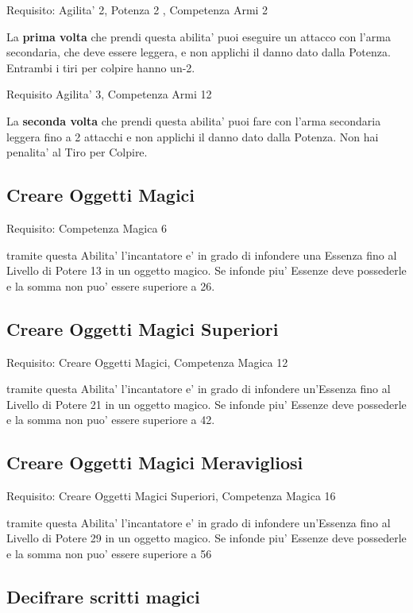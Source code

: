 \documentclass[a4paper,11pt,twoside,openany]{dndbook}
\begin{document}
Requisito: Agilita' 2, Potenza 2 , Competenza Armi 2

La \textbf{prima volta} che prendi questa abilita' puoi eseguire un attacco con l'arma secondaria, che deve essere leggera, e non applichi il danno dato dalla Potenza. Entrambi i tiri per colpire hanno un-2.

Requisito Agilita' 3, Competenza Armi 12

La \textbf{seconda volta} che prendi questa abilita' puoi fare con l'arma secondaria leggera fino a 2 attacchi e non applichi il danno dato dalla Potenza. Non hai penalita' al Tiro per Colpire.

\subsection{Creare Oggetti Magici}

Requisito: Competenza Magica 6

tramite questa Abilita' l'incantatore e' in grado di infondere una Essenza fino al Livello di Potere 13 in un oggetto magico. Se infonde piu' Essenze deve possederle e la somma non puo' essere superiore a 26.

\subsection{Creare Oggetti Magici Superiori}

Requisito: Creare Oggetti Magici, Competenza Magica 12

tramite questa Abilita' l'incantatore e' in grado di infondere un'Essenza fino al Livello di Potere 21 in un oggetto magico. Se infonde piu' Essenze deve possederle e la somma non puo' essere superiore a 42.

\subsection{Creare Oggetti Magici Meravigliosi}

Requisito: Creare Oggetti Magici Superiori, Competenza Magica 16

tramite questa Abilita' l'incantatore e' in grado di infondere un'Essenza fino al Livello di Potere 29 in un oggetto magico. Se infonde piu' Essenze deve possederle e la somma non puo' essere superiore a 56

\subsection{Decifrare scritti magici}
\end{document}
